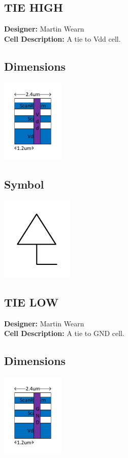 \newpage

\begin{multicols}{2}
\subsection{TIE HIGH}
\makebox[\linewidth]{\rule{0.5\textwidth}{0.4pt}}
{\bf Designer: } Martin Wearn\\
{\bf Cell Description: } A tie to Vdd cell.\\
\subsection*{Dimensions}\includegraphics[width=\textwidth,height=4cm,keepaspectratio=true]{../tiehigh/blackbox.pdf}
\subsection*{Symbol}\includegraphics[width=\textwidth,height=4cm,keepaspectratio=true]{../tiehigh/symbol.pdf}

\subsection{TIE LOW}
\makebox[\linewidth]{\rule{0.5\textwidth}{0.4pt}} 
{\bf Designer: } Martin Wearn\\
{\bf Cell Description: } A  tie to GND cell.\\
\subsection*{Dimensions}\includegraphics[width=\textwidth,height=4cm,keepaspectratio=true]{../tielow/blackbox.pdf}

\end{multicols}

